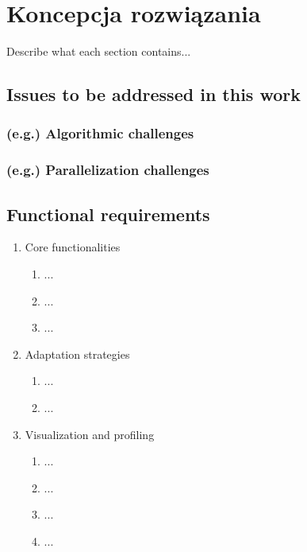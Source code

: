 
\chapter{Koncepcja rozwiązania} \label{chap:problem-formulation}

Describe what each section contains...

\section{Issues to be addressed in this work}

\subsection{(e.g.) Algorithmic challenges}

\bt

\subsection{(e.g.) Parallelization challenges}

\bt

\section{Functional requirements}

\begin{enumerate}
	\item Core functionalities
	\begin{enumerate}
		\item ...
		\item ...
		\item ...
	\end{enumerate}

	\item Adaptation strategies
	\begin{enumerate}
		\item ...
		\item ...
	\end{enumerate}

	\item Visualization and profiling
	\begin{enumerate}
		\item ...
		\item ...
		\item ...
		\item ...
	\end{enumerate}
\end{enumerate}


